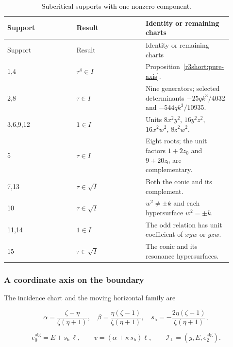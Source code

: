 \documentclass[11pt,a4paper]{article}
\numberwithin{equation}{section}
\theoremstyle{plain}
\theoremstyle{definition}
\theoremstyle{remark}
\begin{document}
\begin{longtable}{@{}p{0.305\linewidth}p{0.305\linewidth}p{0.305\linewidth}@{}}

\caption{Subcritical supports with one nonzero component.}\label{tab:r3-single-supports}\\
\toprule Support & Result & Identity or remaining charts\\\midrule\endfirsthead
\toprule Support & Result & Identity or remaining charts\\\midrule\endhead

1,4 & $\tau^4\in I$ & Proposition~\ref{r3short:pure-axis}.\\

2,8 & $\tau\in I$ & Nine generators; selected determinants $-25qk^3/4032$ and $-544qk^3/10935$.\\

3,6,9,12 & $1\in I$ & Units $8x^2y^2$, $16y^2z^2$, $16x^2w^2$, $8z^2w^2$.\\

5 & $\tau\in I$ & Eight roots; the unit factors $1+2z_0$ and $9+20z_0$ are complementary.\\

7,13 & $\tau\in\sqrt I$ & Both the conic and its complement.\\

10 & $\tau\in\sqrt I$ & $w^2\ne\pm k$ and each hypersurface $w^2=\pm k$.\\

11,14 & $1\in I$ & The odd relation has unit coefficient of $xyw$ or $yzw$.\\

15 & $\tau\in\sqrt I$ & The conic and its resonance hypersurfaces.\\

\bottomrule\end{longtable}

\subsubsection{A coordinate axis on the boundary}
The incidence chart and the moving horizontal family are

\begin{equation}\alpha=\frac{\zeta -\eta }{\zeta (\eta +1)},\quad \beta=\frac{\eta (\zeta -1)}{\zeta (\eta +1)},\quad s_{\mathrm h}=-\frac{2\eta (\zeta +1)}{\zeta (\eta +1)},\end{equation}

\begin{equation}e_0^{\mathrm{alg}}=E+s_{\mathrm h}\,\ell,\qquad v=(\alpha+\kappa\,s_{\mathrm h})\ell,\qquad \mathcal I_\perp=(y,E,e_2^{\mathrm{alg}}).\end{equation}
\end{document}
